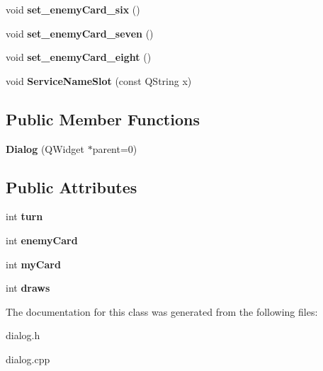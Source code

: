 \begin{DoxyCompactItemize}
\item 
void {\bfseries set\+\_\+enemy\+Card\+\_\+six} ()\hypertarget{classDialog_a12d4451007270c3b5a32995a32146763}{}\label{classDialog_a12d4451007270c3b5a32995a32146763}

\item 
void {\bfseries set\+\_\+enemy\+Card\+\_\+seven} ()\hypertarget{classDialog_a232c6ca253c7e4b3e1713baade7f9529}{}\label{classDialog_a232c6ca253c7e4b3e1713baade7f9529}

\item 
void {\bfseries set\+\_\+enemy\+Card\+\_\+eight} ()\hypertarget{classDialog_abaa349295babf51236e0f2dda7010633}{}\label{classDialog_abaa349295babf51236e0f2dda7010633}

\item 
void {\bfseries Service\+Name\+Slot} (const Q\+String x)\hypertarget{classDialog_a8b182266a249c997b8c4538f72ffa742}{}\label{classDialog_a8b182266a249c997b8c4538f72ffa742}

\end{DoxyCompactItemize}
\subsection*{Public Member Functions}
\begin{DoxyCompactItemize}
\item 
{\bfseries Dialog} (Q\+Widget $\ast$parent=0)\hypertarget{classDialog_acfa2063f9f962d394c6a645b6e7e08d8}{}\label{classDialog_acfa2063f9f962d394c6a645b6e7e08d8}

\end{DoxyCompactItemize}
\subsection*{Public Attributes}
\begin{DoxyCompactItemize}
\item 
int {\bfseries turn}\hypertarget{classDialog_aa4b532cd0a5882281f07bb96fe04fb5a}{}\label{classDialog_aa4b532cd0a5882281f07bb96fe04fb5a}

\item 
int {\bfseries enemy\+Card}\hypertarget{classDialog_a6e2d428daca601db795c2b8715c04296}{}\label{classDialog_a6e2d428daca601db795c2b8715c04296}

\item 
int {\bfseries my\+Card}\hypertarget{classDialog_a7b6569acb258ed1016addd87596ebda1}{}\label{classDialog_a7b6569acb258ed1016addd87596ebda1}

\item 
int {\bfseries draws}\hypertarget{classDialog_ab13661dffc3f1bfaf59f1b2f0ba221c5}{}\label{classDialog_ab13661dffc3f1bfaf59f1b2f0ba221c5}

\end{DoxyCompactItemize}


The documentation for this class was generated from the following files\+:\begin{DoxyCompactItemize}
\item 
dialog.\+h\item 
dialog.\+cpp\end{DoxyCompactItemize}
